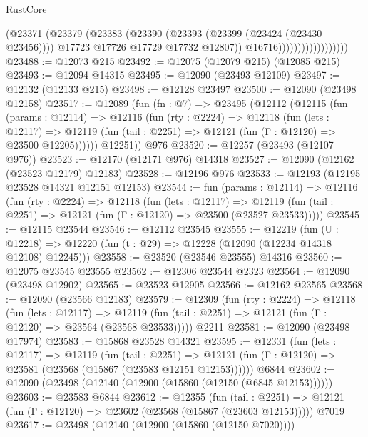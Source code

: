 \begin{lexlean}{RustCore}
\begin{coremodule}
                                    (@23371
                                      (@23379
                                        (@23383
                                          (@23390
                                            (@23393 (@23399 (@23424 (@23430 @23456))))
                                            @17723
                                            @17726
                                            @17729
                                            @17732
                                            @12807))
                                        @16716))))))))))))))))))
@23488 := @12073 @215
@23492 := @12075 (@12079 @215) (@12085 @215)
@23493 := @12094 @14315
@23495 := @12090 (@23493 @12109)
@23497 := @12132 (@12133 @215)
@23498 := @12128 @23497
@23500 := @12090 (@23498 @12158)
@23517 := @12089
    (fun (fn : @7) =>
    @23495
      (@12112
        (@12115
          (fun (params : @12114) =>
          @12116
            (fun (rty : @2224) =>
            @12118
              (fun (lets : @12117) =>
              @12119 (fun (tail : @2251) => @12121 (fun (Γ : @12120) => @23500 @12205))))))
        @12251))
    @976
@23520 := @12257 (@23493 (@12107 @976))
@23523 := @12170 (@12171 @976) @14318
@23527 := @12090 (@12162 (@23523 @12179) @12183)
@23528 := @12196 @976
@23533 := @12193 (@12195 @23528 @14321 @12151 @12153)
@23544 := fun (params : @12114) =>
  @12116
    (fun (rty : @2224) =>
    @12118
      (fun (lets : @12117) =>
      @12119 (fun (tail : @2251) => @12121 (fun (Γ : @12120) => @23500 (@23527 @23533)))))
@23545 := @12115 @23544
@23546 := @12112 @23545
@23555 := @12219
    (fun (U : @12218) => @12220 (fun (t : @29) => @12228 (@12090 (@12234 @14318 @12108) @12245)))
@23558 := @23520 (@23546 @23555) @14316
@23560 := @12075 @23545 @23555
@23562 := @12306 @23544 @2323
@23564 := @12090 (@23498 @12902)
@23565 := @23523 @12905
@23566 := @12162 @23565
@23568 := @12090 (@23566 @12183)
@23579 := @12309
    (fun (rty : @2224) =>
    @12118
      (fun (lets : @12117) =>
      @12119 (fun (tail : @2251) => @12121 (fun (Γ : @12120) => @23564 (@23568 @23533)))))
    @2211
@23581 := @12090 (@23498 @17974)
@23583 := @15868 @23528 @14321
@23595 := @12331
    (fun (lets : @12117) =>
    @12119
      (fun (tail : @2251) =>
      @12121 (fun (Γ : @12120) => @23581 (@23568 (@15867 (@23583 @12151 @12153))))))
    @6844
@23602 := @12090 (@23498 (@12140 (@12900 (@15860 (@12150 (@6845 @12153))))))
@23603 := @23583 @6844
@23612 := @12355
    (fun (tail : @2251) => @12121 (fun (Γ : @12120) => @23602 (@23568 (@15867 (@23603 @12153)))))
    @7019
@23617 := @23498 (@12140 (@12900 (@15860 (@12150 @7020))))

\end{coremodule}
\end{lexlean}
